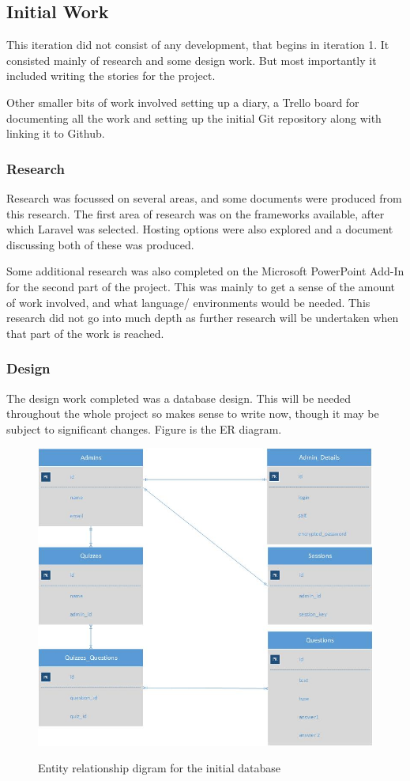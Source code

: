 \subsection{Initial Work}
This iteration did not consist of any development, that begins in iteration 1. It consisted mainly of research and some design work. But most importantly it included writing the stories for the project. 

Other smaller bits of work involved setting up a diary, a Trello board for documenting all the work and setting up the initial Git repository along with linking it to Github.
\subsubsection{Research}
Research was focussed on several areas, and some documents were produced from this research. The first area of research was on the frameworks available, after which Laravel was selected. Hosting options were also explored and a document discussing both of these was produced.

Some additional research was also completed on the Microsoft PowerPoint Add-In for the second part of the project. This was mainly to get a sense of the amount of work involved, and what language/ environments would be needed. This research did not go into much depth as further research will be undertaken when that part of the work is reached.
\subsubsection{Design}
The design work completed was a database design. This will be needed throughout the whole project so makes sense to write now, though it may be subject to significant changes. Figure \cite{fig:initial-er-diagram} is the ER diagram.

\begin{figure}
	\caption{Entity relationship digram for the initial database}
	\includegraphics[width=\textwidth]{Chapter2/Iter-0/Initial-ERDiagram}
	\label{fig:initial-er-diagram}
\end{figure}

